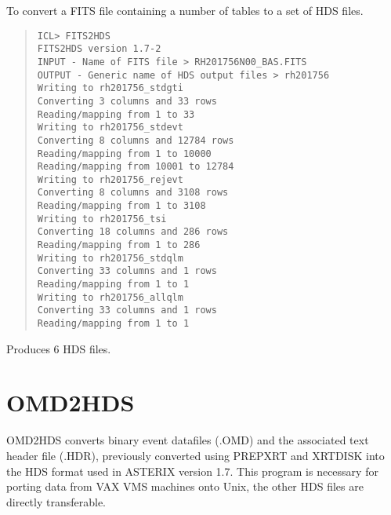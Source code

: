 \documentclass{book}
\renewcommand{\_}{{\tt\char'137}}     %
\begin{document}
To convert a FITS file containing a number of tables to a set of HDS
files.
\begin{quote}\begin{verbatim}
ICL> FITS2HDS
FITS2HDS version 1.7-2
INPUT - Name of FITS file > RH201756N00_BAS.FITS
OUTPUT - Generic name of HDS output files > rh201756
Writing to rh201756_stdgti
Converting 3 columns and 33 rows
Reading/mapping from 1 to 33
Writing to rh201756_stdevt
Converting 8 columns and 12784 rows
Reading/mapping from 1 to 10000
Reading/mapping from 10001 to 12784
Writing to rh201756_rejevt
Converting 8 columns and 3108 rows
Reading/mapping from 1 to 3108
Writing to rh201756_tsi
Converting 18 columns and 286 rows
Reading/mapping from 1 to 286
Writing to rh201756_stdqlm
Converting 33 columns and 1 rows
Reading/mapping from 1 to 1
Writing to rh201756_allqlm
Converting 33 columns and 1 rows
Reading/mapping from 1 to 1
\end{verbatim}\end{quote}
Produces 6 HDS files.
\section{OMD2HDS}
OMD2HDS converts binary event datafiles (.OMD) and the associated text
header file (.HDR), previously converted using PREPXRT and XRTDISK into
the HDS format used in ASTERIX version 1.7. This program is necessary
for porting data from VAX VMS machines onto Unix, the other HDS files
are directly transferable.
\end{document}
